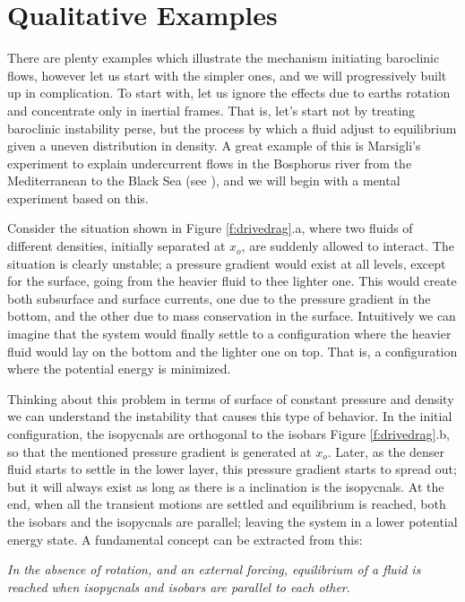 \section{Qualitative Examples}
\label{s:examples}
There are plenty examples which illustrate the mechanism initiating baroclinic flows, however let us start with the simpler ones, and we will progressively built up in complication. To start with, let us ignore the effects due to earths rotation and concentrate only in inertial frames. That is, let's start not by treating baroclinic instability perse, but the process by which a fluid adjust to equilibrium given a uneven distribution in density. A great example of this is Marsigli's experiment to explain undercurrent flows in the Bosphorus river from the Mediterranean to the Black Sea (see ), and we will begin with a mental experiment based on this.

Consider the situation shown in Figure \ref{f:drivedrag}.a, where two fluids of different densities, initially separated at $x_o$, are suddenly allowed to interact. The situation is clearly unstable; a pressure gradient would exist at all levels, except for the surface, going from the heavier fluid to thee lighter one. This would create both subsurface and surface currents, one due to the pressure gradient in the bottom, and the other due to mass conservation in the surface. Intuitively we can imagine that the system would finally settle to a configuration where the heavier fluid would lay on the bottom and the lighter one on top. That is, a configuration where the potential energy is minimized.

Thinking about this problem in terms of surface of constant pressure and density we can understand the instability that causes this type of behavior. In the initial configuration, the isopycnals are orthogonal to the isobars Figure \ref{f:drivedrag}.b, so that the mentioned pressure gradient is generated at $x_o$. Later, as the denser fluid starts to settle in the lower layer, this pressure gradient starts to spread out; but it will always exist as long as there is a inclination is the isopycnals. At the end, when all the transient motions are settled and equilibrium is reached, both  the isobars and the isopycnals are parallel; leaving the system in a lower potential energy state. A fundamental concept can be extracted from this:

\emph{In the absence of rotation, and an external forcing, equilibrium of a fluid is reached when isopycnals and isobars are parallel to each other}.

